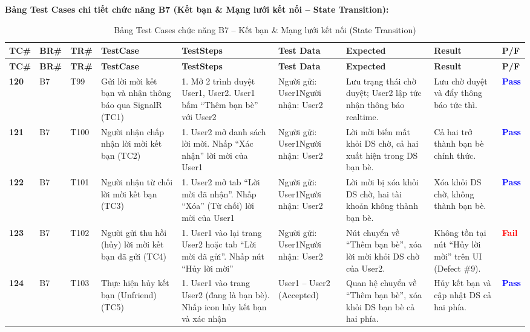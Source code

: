 \documentclass[11pt,a4paper]{article}
\begin{document}
\noindent\textbf{Bảng Test Cases chi tiết chức năng B7 (Kết bạn \& Mạng lưới kết nối -- State Transition):}
\begingroup
\scriptsize
\setlength{\tabcolsep}{3pt}
\begin{longtable}{|C{0.8cm}|C{0.75cm}|C{0.95cm}|L{2.0cm}|L{3.0cm}|L{2.25cm}|L{2.6cm}|L{2.5cm}|C{0.85cm}|}
\hline
{}
\textbf{TC\#} & \textbf{BR\#} & \textbf{TR\#} & \textbf{TestCase} & \textbf{TestSteps} & \textbf{Test Data} & \textbf{Expected} & \textbf{Result} & \textbf{P/F} \tabularnewline
\hline
\endfirsthead
\hline
{}
\textbf{TC\#} & \textbf{BR\#} & \textbf{TR\#} & \textbf{TestCase} & \textbf{TestSteps} & \textbf{Test Data} & \textbf{Expected} & \textbf{Result} & \textbf{P/F} \tabularnewline
\hline
\endhead
\hline
\endfoot
\hline
\caption{Bảng Test Cases chức năng B7 -- Kết bạn \& Mạng lưới kết nối (State Transition)}
\endlastfoot
\textbf{120} & B7 & T99 & Gửi lời mời kết bạn và nhận thông báo qua SignalR (TC1) & 1. Mở 2 trình duyệt User1, User2. User1 bấm ``Thêm bạn bè'' với User2 & Người gửi: User1\newline Người nhận: User2 & Lưu trạng thái chờ duyệt; User2 lập tức nhận thông báo realtime. & Lưu chờ duyệt và đẩy thông báo tức thì. & \textcolor{blue}{\textbf{Pass}} \\ \hline
\textbf{121} & B7 & T100 & Người nhận chấp nhận lời mời kết bạn (TC2) & 1. User2 mở danh sách lời mời. Nhấp ``Xác nhận'' lời mời của User1 & Người gửi: User1\newline Người nhận: User2 & Lời mời biến mất khỏi DS chờ, cả hai xuất hiện trong DS bạn bè. & Cả hai trở thành bạn bè chính thức. & \textcolor{blue}{\textbf{Pass}} \\ \hline
\textbf{122} & B7 & T101 & Người nhận từ chối lời mời kết bạn (TC3) & 1. User2 mở tab ``Lời mời đã nhận''. Nhấp ``Xóa'' (Từ chối) lời mời của User1 & Người gửi: User1\newline Người nhận: User2 & Lời mời bị xóa khỏi DS chờ, hai tài khoản không thành bạn bè. & Xóa khỏi DS chờ, không thành bạn bè. & \textcolor{blue}{\textbf{Pass}} \\ \hline
\textbf{123} & B7 & T102 & Người gửi thu hồi (hủy) lời mời kết bạn đã gửi (TC4) & 1. User1 vào lại trang User2 hoặc tab ``Lời mời đã gửi''. Nhấp nút ``Hủy lời mời'' & Người gửi: User1\newline Người nhận: User2 & Nút chuyển về ``Thêm bạn bè'', xóa lời mời khỏi DS chờ của User2. & Không tồn tại nút ``Hủy lời mời'' trên UI (Defect \#9). & \textcolor{red}{\textbf{Fail}} \\ \hline
\textbf{124} & B7 & T103 & Thực hiện hủy kết bạn (Unfriend) (TC5) & 1. User1 vào trang User2 (đang là bạn bè). Nhấp icon hủy kết bạn và xác nhận & User1 -- User2 (Accepted) & Quan hệ chuyển về ``Thêm bạn bè'', xóa khỏi DS bạn bè cả hai phía. & Hủy kết bạn và cập nhật DS cả hai phía. & \textcolor{blue}{\textbf{Pass}} \\ \hline
\end{longtable}
\endgroup
\end{document}

